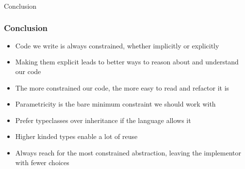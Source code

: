 \begin{section}{Conclusion}
\begin{frame}
\footnotesize
\frametitle{Conclusion}
\begin{itemize}
\item Code we write is always constrained, whether implicitly or explicitly
\item Making them explicit leads to better ways to reason about and understand our code
\item The more constrained our code, the more easy to read and refactor it is
\item Parametricity is the bare minimum constraint we should work with
\item Prefer typeclasses over inheritance if the language allows it
\item Higher kinded types enable a lot of reuse
\item Always reach for the most constrained abstraction, leaving the implementor with fewer choices
\end{itemize}
\end{frame}
\end{section}
